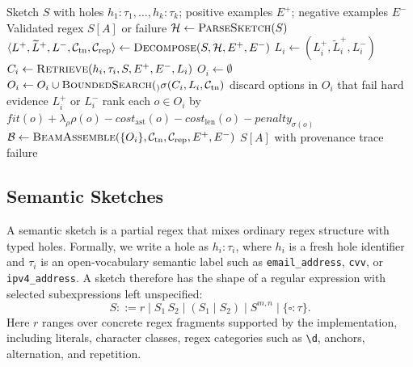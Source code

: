 \documentclass[sigconf,nonacm]{acmart}
\begin{document}
\begin{algorithm}[t]
\caption{\textsc{Synthesize}$(S, E^+, E^-)$}\label{alg:synthesize}
\begin{algorithmic}[1]
\Require Sketch $S$ with holes $h_1{:}\tau_1,\dots,h_k{:}\tau_k$;
         positive examples $E^+$; negative examples $E^-$
\Ensure  Validated regex $S[A]$ or failure
\Statex
\State $\mathcal{H} \gets \Call{ParseSketch}{S}$
\State $\langle L^+, \widetilde{L}^+, L^-, \mathcal{C}_{\mathrm{tn}}, \mathcal{C}_{\mathrm{rep}} \rangle
    \gets \Call{Decompose}{S, \mathcal{H}, E^+, E^-}$
\Statex
{}
    \State $L_i \gets (L_i^+, \widetilde{L}_i^+, L_i^-)$
    \State $C_i \gets \Call{Retrieve}{h_i, \tau_i, S, E^+, E^-, L_i}$
    \State $O_i \gets \emptyset$
        \State $O_i \gets O_i \cup \Call{BoundedSearch}_\sigma(C_i, L_i, \mathcal{C}_{\mathrm{tn}})$
    \EndFor
    \State discard options in $O_i$ that fail hard evidence $L_i^+$ or $L_i^-$
    \State rank each $o \in O_i$ by $\mathit{fit}(o) + \lambda_\rho\rho(o) - \mathit{cost}_{\mathrm{ast}}(o) - \mathit{cost}_{\mathrm{len}}(o) - \mathit{penalty}_{\sigma(o)}$
\EndFor
\Statex
\State $\mathcal{B} \gets \Call{BeamAssemble}{\{O_i\}, \mathcal{C}_{\mathrm{tn}}, \mathcal{C}_{\mathrm{rep}}, E^+, E^-}$
        \State \Return $S[A]$ with provenance trace
    \EndIf
\EndFor
\State \Return failure
\end{algorithmic}
\end{algorithm}

\subsection{Semantic Sketches}
A semantic sketch is a partial regex that mixes ordinary regex structure with
typed holes. Formally, we write a hole as \(h_i:\tau_i\), where \(h_i\) is a
fresh hole identifier and \(\tau_i\) is an open-vocabulary semantic label such
as \texttt{email\_address}, \texttt{cvv}, or \texttt{ipv4\_address}. A sketch
therefore has the shape of a regular expression with selected subexpressions
left unspecified:
\[
  S ::= r \mid S_1\,S_2 \mid (S_1 \;|\; S_2) \mid S^{m,n}
  \mid \{\square:\tau\}.
\]
Here \(r\) ranges over concrete regex fragments supported by the implementation,
including literals, character classes, regex categories such as \texttt{\textbackslash d},
anchors, alternation, and repetition.
\end{document}
